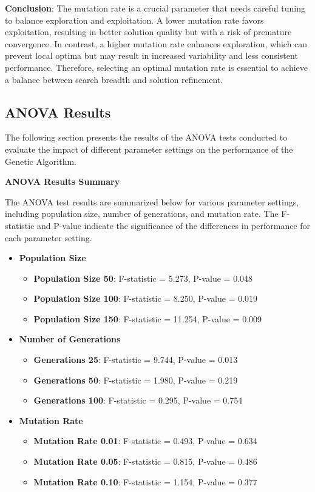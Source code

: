 \documentclass{article}
\begin{document}
    \textbf{Conclusion}: The mutation rate is a crucial parameter that needs careful tuning to balance exploration and exploitation. A lower mutation rate favors exploitation, resulting in better solution quality but with a risk of premature convergence. In contrast, a higher mutation rate enhances exploration, which can prevent local optima but may result in increased variability and less consistent performance. Therefore, selecting an optimal mutation rate is essential to achieve a balance between search breadth and solution refinement.

    \subsection{ANOVA Results}

    The following section presents the results of the ANOVA tests conducted to evaluate the impact of different parameter settings on the performance of the Genetic Algorithm.

    \textbf{ANOVA Results Summary}

    The ANOVA test results are summarized below for various parameter settings, including population size, number of generations, and mutation rate. The F-statistic and P-value indicate the significance of the differences in performance for each parameter setting.

    \begin{itemize}
        \item \textbf{Population Size}
        \begin{itemize}
            \item \textbf{Population Size 50}: F-statistic = 5.273, P-value = 0.048
            \item \textbf{Population Size 100}: F-statistic = 8.250, P-value = 0.019
            \item \textbf{Population Size 150}: F-statistic = 11.254, P-value = 0.009
        \end{itemize}
        \item \textbf{Number of Generations}
        \begin{itemize}
            \item \textbf{Generations 25}: F-statistic = 9.744, P-value = 0.013
            \item \textbf{Generations 50}: F-statistic = 1.980, P-value = 0.219
            \item \textbf{Generations 100}: F-statistic = 0.295, P-value = 0.754
        \end{itemize}
        \item \textbf{Mutation Rate}
        \begin{itemize}
            \item \textbf{Mutation Rate 0.01}: F-statistic = 0.493, P-value = 0.634
            \item \textbf{Mutation Rate 0.05}: F-statistic = 0.815, P-value = 0.486
            \item \textbf{Mutation Rate 0.10}: F-statistic = 1.154, P-value = 0.377
        \end{itemize}
    \end{itemize}
\end{document}
